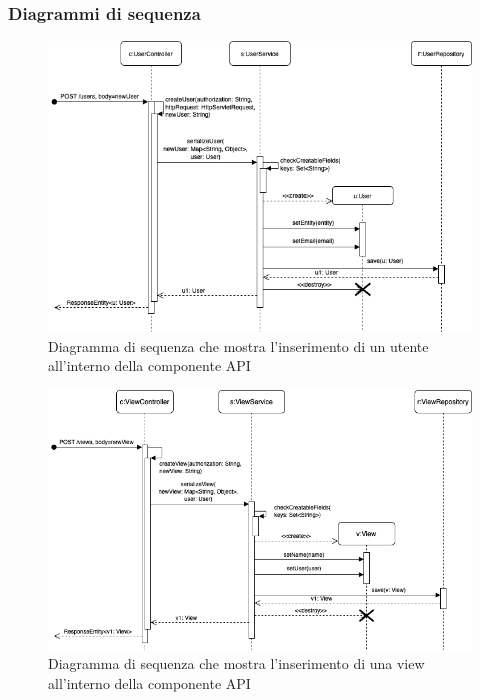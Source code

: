 \begin{landscape}
	\subsubsection{Diagrammi di sequenza}%
		\begin{figure}[H]
			\centering
			\includegraphics[scale=0.750]{res/images/API/inserimento_utente.png}
			\caption{Diagramma di sequenza che mostra l'inserimento di un utente all'interno della componente API}
			\label{Diagramma 17}
		\end{figure}
		\begin{figure}[H]
			\centering
			\includegraphics[scale=0.750]{res/images/API/inserimento_view.png}
			\caption{Diagramma di sequenza che mostra l'inserimento di una view all'interno della componente API}
			\label{Diagramma 18}
		\end{figure}
	\end{landscape}

